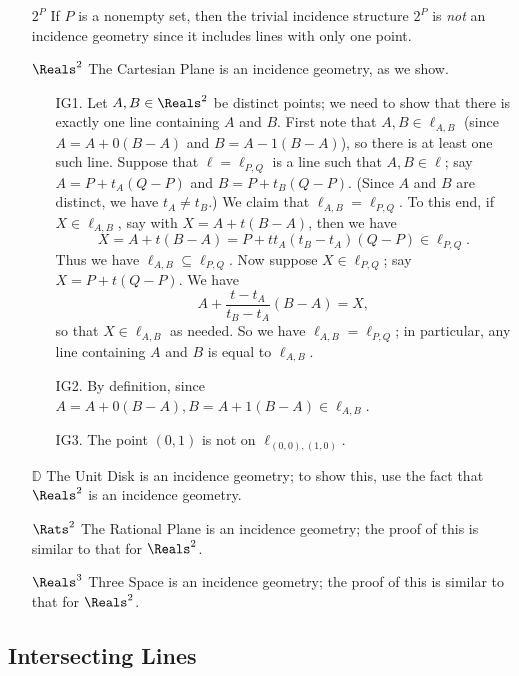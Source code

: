 \documentclass{article}
\begin{document}
\begin{itemize}
\item[$2^P$] If $P$ is a nonempty set, then the trivial incidence structure $2^P$ is \emph{not} an incidence geometry since it includes lines with only one point.

\item[$\Reals^2$] The Cartesian Plane is an incidence geometry, as we show.
\begin{itemize}
\item[IG1.] Let $A,B \in \Reals^2$ be distinct points; we need to show that there is exactly one line containing $A$ and $B$. First note that $A,B \in \ell_{A,B}$ (since $A = A + 0(B-A)$ and $B = A - 1(B-A)$), so there is at least one such line. Suppose that $\ell = \ell_{P,Q}$ is a line such that $A,B \in \ell$; say $A = P + t_A(Q-P)$ and $B = P + t_B(Q-P)$. (Since $A$ and $B$ are distinct, we have $t_A \neq t_B$.) We claim that $\ell_{A,B} = \ell_{P,Q}$. To this end, if $X \in \ell_{A,B}$, say with $X = A + t(B-A)$, then we have \[X = A + t(B-A) = P + tt_A(t_B - t_A)(Q-P) \in \ell_{P,Q}. \] Thus we have $\ell_{A,B} \subseteq \ell_{P,Q}$. Now suppose $X \in \ell_{P,Q}$; say $X = P + t(Q-P)$. We have \[ A + \frac{t-t_A}{t_B-t_A}(B-A) = X, \] so that $X \in \ell_{A,B}$ as needed. So we have $\ell_{A,B} = \ell_{P,Q}$; in particular, any line containing $A$ and $B$ is equal to $\ell_{A,B}$.
\item[IG2.] By definition, since $A = A + 0(B-A), B = A + 1(B-A) \in \ell_{A,B}$.
\item[IG3.] The point $(0,1)$ is not on $\ell_{(0,0),(1,0)}$.
\end{itemize}

\item[$\mathbb{D}$] The Unit Disk is an incidence geometry; to show this, use the fact that $\Reals^2$ is an incidence geometry.

\item[$\Rats^2$] The Rational Plane is an incidence geometry; the proof of this is similar to that for $\Reals^2$.

\item[$\Reals^3$] Three Space is an incidence geometry; the proof of this is similar to that for $\Reals^2$.
\end{itemize}



\subsection*{Intersecting Lines}
\end{document}

